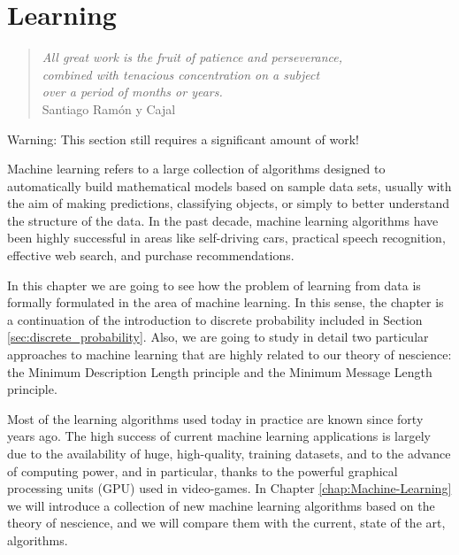 %
%


\chapter{Learning}
\label{ch:Learning}

\begin{quote}
    \begin{flushright}
        \emph{All great work is the fruit of patience and perseverance,\\
            combined with tenacious concentration on a subject\\
            over a period of months or years.}\\
        Santiago Ramón y Cajal
    \end{flushright}
\end{quote}
\bigskip

{\color{red} Warning: This section still requires a significant amount of work!}

Machine learning refers to a large collection of algorithms designed to automatically build mathematical models based on sample data sets, usually with the aim of making predictions, classifying objects, or simply to better understand the structure of the data. In the past decade, machine learning algorithms have been highly successful in areas like self-driving cars, practical speech recognition, effective web search, and purchase recommendations.

In this chapter we are going to see how the problem of learning from data is formally formulated in the area of machine learning. In this sense, the chapter is a continuation of the introduction to discrete probability included in Section \ref{sec:discrete_probability}. Also, we are going to study in detail two particular approaches to machine learning that are highly related to our theory of nescience: the Minimum Description Length principle and the Minimum Message Length principle.

Most of the learning algorithms used today in practice are known since forty years ago. The high success of current machine learning applications is largely due to the availability of huge, high-quality, training datasets, and to the advance of computing power, and in particular, thanks to the powerful graphical processing units (GPU) used in video-games. In Chapter \ref{chap:Machine-Learning} we will introduce a collection of new machine learning algorithms based on the theory of nescience, and we will compare them with the current, state of the art, algorithms.

